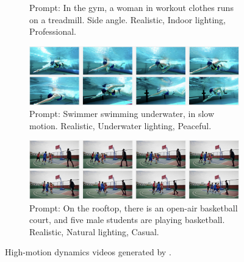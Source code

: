 \begin{figure}[!htbp]
\begin{subfigure}{\textwidth}
        \captionsetup{font=small}
        \caption{Prompt: In the gym, a woman in workout clothes runs on a treadmill. Side angle. Realistic, Indoor lighting, Professional.}
        \label{fig:hm_3}
    \end{subfigure}
    \hfill
    \begin{subfigure}{\textwidth}
        \centering
        \includegraphics[width=\textwidth]{figures/high_motion_7.jpg}
        \captionsetup{font=small}
        \caption{Prompt: Swimmer swimming underwater, in slow motion. Realistic, Underwater lighting, Peaceful.}
        \label{fig:hm_4}
    \end{subfigure}
    \hfill
    \begin{subfigure}{\textwidth}
        \centering
        \includegraphics[width=\textwidth]{figures/high_motion_8.jpg}
        \captionsetup{font=small}
        \caption{Prompt: On the rooftop, there is an open-air basketball court, and five male students are playing basketball. Realistic, Natural lighting, Casual.}
        \label{fig:hm_5}
    \end{subfigure}
    \caption{High-motion dynamics videos generated by \nameofmethod{}.}
    \label{fig:high_motion}
\end{figure}


